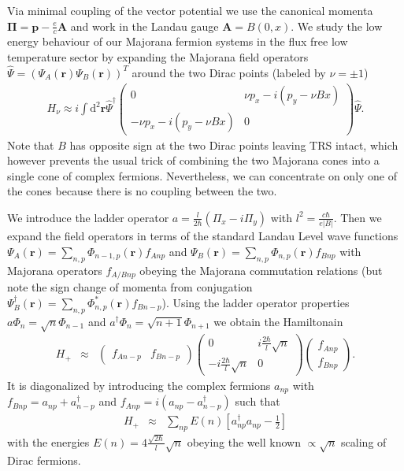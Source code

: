\documentclass[reprint,amsmath,amssymb,aps,prb,groupedaddress,nofootinbib,superscriptaddress]{revtex4-1}
\newcommand{\1}{\mathds{1}}
\begin{document}
Via minimal coupling of the vector potential we use the canonical momenta $\mathbf{\Pi}= \mathbf{p}-\frac{e}{c} \mathbf{A}$ and work in the Landau gauge $\mathbf{A}=B(0,x)$. We study the low energy behaviour of our Majorana fermion systems in the flux free low temperature sector by expanding the Majorana field operators $\hat \Psi = \left( \Psi_{A}(\mathbf{r}) \Psi_{B}(\mathbf{r}) \right)^T$ around the two Dirac points (labeled by $\nu=\pm 1$)
\begin{eqnarray}
H_{\nu} \approx i \int \text{d}^2 \mathbf{r} 
\hat \Psi^{\dagger}
\begin{pmatrix}
0 & \nu p_x- i(p_y- \nu B x) \\
- \nu p_x- i(p_y-\nu B x) & 0 
\end{pmatrix}
\hat \Psi \nonumber .
\end{eqnarray}
Note that $B$ has opposite sign at the two Dirac points leaving TRS intact, which however prevents the usual trick of combining the two Majorana cones into a single cone of complex fermions. Nevertheless, we can concentrate on only one of the cones because there is no coupling between the two.  


We introduce the ladder operator $a=\frac{l}{2\hbar} \left(\Pi_x-i \Pi_y \right)$ with $l^2=\frac{c\hbar}{e|B|}$. Then we expand the field operators in terms of the standard Landau Level wave functions $\Psi_{A} (\mathbf{r}) = \sum_{n,p} \Phi_{n-1,p} (\mathbf{r}) f_{A n p}$ and $\Psi_{B} (\mathbf{r}) = \sum_{n,p} \Phi_{n,p} (\mathbf{r}) f_{B n p}$ with Majorana operators $f_{A/B n p}$ obeying the Majorana commutation relations (but note the sign change of momenta from conjugation $\Psi_{B}^{\dagger} (\mathbf{r}) = \sum_{n,p} \Phi^*_{n,p} (\mathbf{r}) f_{B n -p}$). Using the ladder operator properties $a \Phi_n=\sqrt{n} \Phi_{n-1}$ and $a^{\dagger} \Phi_n=\sqrt{n+1} \Phi_{n+1}$ we obtain the Hamiltonain
\begin{eqnarray}
H_{+}  & \approx & 
\begin{pmatrix}
f_{An-p} & f_{B n -p} 
\end{pmatrix}
\begin{pmatrix}
0 & i \frac{2 \hbar}{l} \sqrt{n} \\
- i \frac{2 \hbar}{l} \sqrt{n} & 0 
\end{pmatrix}
\begin{pmatrix}
f_{A n p} \\ f_{B n p} 
\end{pmatrix}.
\end{eqnarray}
It is diagonalized by introducing  the complex fermions $a_{np}$ with $f_{Bnp}=a_{np}+a^{\dagger}_{n-p}$ and $f_{Anp}=i \left(a_{np}  -a_{n-p}^{\dagger}\right)$ such that
\begin{eqnarray}
H_{+}  & \approx & 
\sum_{np} E(n) \left[ a_{np}^{\dagger} a_{np} -\frac{1}{2}\right] 
\end{eqnarray}
with the energies $E(n)=4 \frac{\sqrt{2\hbar}}{l} \sqrt{n}$ obeying the well known $\propto\sqrt{n}$ scaling of Dirac fermions. 
\end{document}
